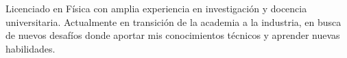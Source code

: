 
Licenciado en Física con amplia experiencia en investigación y docencia universitaria. Actualmente en transición de la academia a la industria, en busca de nuevos desafíos donde aportar mis conocimientos técnicos y aprender nuevas habilidades.


